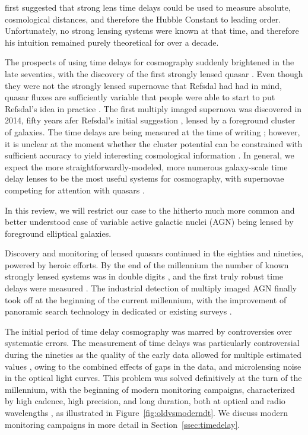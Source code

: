 \citet{Ref64} first suggested that strong lens time delays could be
used to measure absolute, cosmological distances, and
therefore the Hubble Constant to leading order. Unfortunately, no
strong lensing systems were known at that time, and therefore his
intuition remained purely theoretical for over a decade.

The prospects of using time delays for cosmography suddenly brightened
in the late seventies, with the discovery of the first strongly lensed
quasar \citep{WCW79}. Even though they were not the strongly lensed
supernovae that Refsdal had had in mind, quasar fluxes are sufficiently
variable \citep{Van82} that people were able to start to put Refsdal's
idea in practice \citep{Van89}.
The first multiply imaged supernova was discovered in 2014,
fifty years afer Refsdal's initial suggestion \citep{Kel++15}, lensed
by a foreground cluster of galaxies. The time delays are being
measured at the time of writing
\citep{Rod++16,Kel++16}; however, it is unclear at the moment whether the
cluster potential can be constrained with sufficient accuracy to yield
interesting cosmological information \citep{Tre++16}. In general, we
expect the more straightforwardly-modeled, more numerous galaxy-scale
time delay lenses to be the most useful systems for cosmography, with
supernovae competing for attention with quasars \citep{O+M10}.

In this review, we will restrict our case to the hitherto much more
common and better understood case of variable active galactic nuclei
(AGN) being lensed by foreground elliptical galaxies.

Discovery and monitoring of lensed quasars continued in the eighties and
nineties, powered by heroic efforts. By the end of the millennium the
number of known strongly lensed systems was in double digits
\citep{CSS02}, and the first truly robust time delays were measured
\citep{Kun++97,Sch++97}.
The industrial detection of multiply imaged AGN finally took off at the
beginning of the current millennium, with the improvement of panoramic
search technology in dedicated or existing surveys
\citep{Bro++03,Oguri:2006p5865,Agn++15}.

The initial period of time delay cosmography was marred by controversies over
systematic errors.  The measurement of time delays was particularly
controversial during the nineties as the quality of the early data
allowed for multiple estimated values \citep{PRH92}, owing to the combined
effects of gaps in the data, and microlensing noise in the optical
light curves. This problem was solved definitively at the turn of the
millennium, with the beginning of modern monitoring campaigns,
characterized by high cadence, high precision, and long duration, both
at optical and radio wavelengths
\citep{Fas++99,Fas++02,Bur++02,Hjo++02,Jak++05,Eig++05}, as illustrated in
Figure~\ref{fig:oldvsmoderndt}. We discuss
modern monitoring campaigns in more detail in Section~\ref{ssec:timedelay}.

